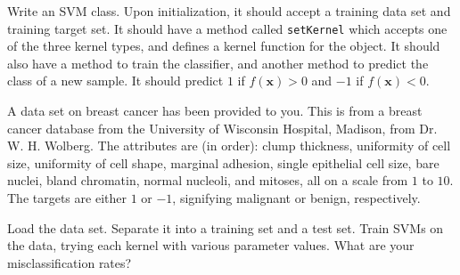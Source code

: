 \begin{problem}
Write an SVM class. Upon initialization, it should accept a training data set and training target set.
It should have a method called \texttt{setKernel} which accepts one of the three kernel types, 
and defines a kernel function for the object. It should also have a method to train the classifier, 
and another method to predict the class of a new sample. 
It should predict $1$ if $f(\mathbf{x}) > 0$ and $-1$ if $f(\mathbf{x}) < 0$.
\end{problem}

A data set on breast cancer has been provided to you. 
This is from a breast cancer database from the University of Wisconsin Hospital, Madison, from Dr. W. H. Wolberg.
The attributes are (in order): clump thickness, uniformity of cell size, uniformity of cell shape, 
marginal adhesion, single epithelial cell size, bare nuclei, bland chromatin, 
normal nucleoli, and mitoses, all on a scale from $1$ to $10$. 
The targets are either $1$ or $-1$, signifying malignant or benign, respectively.

\begin{problem}
Load the data set. Separate it into a training set and a test set. 
Train SVMs on the data, trying each kernel with various parameter values. What are your misclassification rates?
\end{problem}
